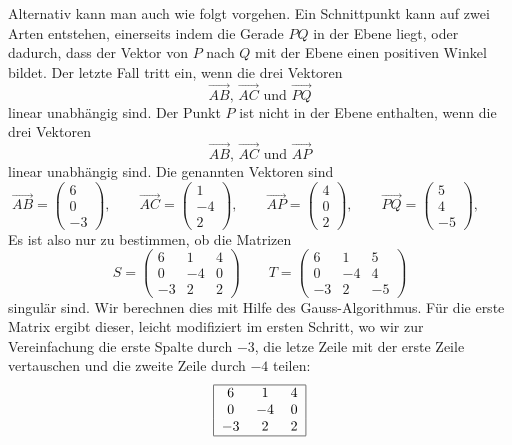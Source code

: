 \begin{loesung}
Alternativ kann man auch wie folgt vorgehen.
Ein Schnittpunkt kann auf zwei Arten entstehen, einerseits indem
die Gerade $PQ$ in der Ebene liegt, oder dadurch, dass der Vektor
von $P$ nach $Q$ mit der Ebene einen positiven Winkel bildet. Der
letzte Fall tritt ein, wenn die drei Vektoren
\[
\overrightarrow{AB}
\text{, }
\overrightarrow{AC}
\text{ und }
\overrightarrow{PQ}
\]
linear unabhängig sind. Der Punkt $P$ ist nicht in der Ebene enthalten,
wenn die drei Vektoren
\[
\overrightarrow{AB}
\text{, }
\overrightarrow{AC}
\text{ und }
\overrightarrow{AP}
\]
linear unabhängig sind.
Die genannten Vektoren sind
\[
\overrightarrow{AB}=\begin{pmatrix}6\\0\\-3\end{pmatrix}, \qquad
\overrightarrow{AC}=\begin{pmatrix}1\\-4\\2\end{pmatrix}, \qquad
\overrightarrow{AP}=\begin{pmatrix}4\\0\\2\end{pmatrix}, \qquad
\overrightarrow{PQ}=\begin{pmatrix}5\\4\\-5\end{pmatrix}, \qquad
\]
Es ist also nur zu bestimmen, ob die Matrizen
\[
S=\begin{pmatrix}
6&1&4\\
0&-4&0\\
-3&2&2
\end{pmatrix}
\qquad
T=\begin{pmatrix}
6&1&5\\
0&-4&4\\
-3&2&-5
\end{pmatrix}
\]
singulär sind. Wir berechnen dies mit Hilfe des Gauss-Algorithmus.
Für die erste Matrix ergibt dieser, leicht modifiziert im ersten
Schritt, wo wir zur Vereinfachung die erste Spalte durch $-3$, die letze Zeile
mit der  erste Zeile vertauschen und die zweite Zeile durch $-4$ teilen:
\begin{align*}
\begin{tabular}{|ccc|}
\hline
6&1&4\\
0&$-4$&0\\
$-3$&2&2\\
\hline
\end{tabular}

\end{align*}
\end{loesung}
